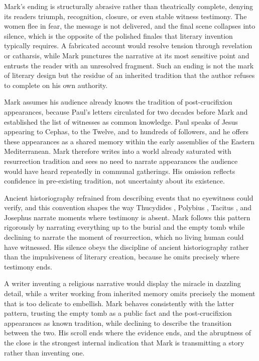 Mark's ending is structurally abrasive rather than theatrically complete, denying its readers triumph, recognition, closure, or even stable witness testimony.
The women flee in fear, the message is not delivered, and the final scene collapses into silence, which is the opposite of the polished finales that literary invention typically requires.
A fabricated account would resolve tension through revelation or catharsis, while Mark punctures the narrative at its most sensitive point and entrusts the reader with an unresolved fragment.
Such an ending is not the mark of literary design but the residue of an inherited tradition that the author refuses to complete on his own authority.

Mark assumes his audience already knows the tradition of post-crucifixion appearances, because Paul's letters circulated for two decades before Mark and established the list of witnesses as common knowledge.
Paul speaks of Jesus appearing to Cephas, to the Twelve, and to hundreds of followers, and he offers these appearances as a shared memory within the early assemblies of the Eastern Mediterranean.
Mark therefore writes into a world already saturated with resurrection tradition and sees no need to narrate appearances the audience would have heard repeatedly in communal gatherings.
His omission reflects confidence in pre-existing tradition, not uncertainty about its existence.

Ancient historiography refrained from describing events that no eyewitness could verify, and this convention shapes the way Thucydides \cite{thucydides:peloponnesian}, Polybius \cite{polybius:histories}, Tacitus \cite{tacitus:annals}, and Josephus \cite{josephus:war} narrate moments where testimony is absent.
Mark follows this pattern rigorously by narrating everything up to the burial and the empty tomb while declining to narrate the moment of resurrection, which no living human could have witnessed.
His silence obeys the discipline of ancient historiography rather than the impulsiveness of literary creation, because he omits precisely where testimony ends.

A writer inventing a religious narrative would display the miracle in dazzling detail, while a writer working from inherited memory omits precisely the moment that is too delicate to embellish.
Mark behaves consistently with the latter pattern, trusting the empty tomb as a public fact and the post-crucifixion appearances as known tradition, while declining to describe the transition between the two.
His scroll ends where the evidence ends, and the abruptness of the close is the strongest internal indication that Mark is transmitting a story rather than inventing one.

